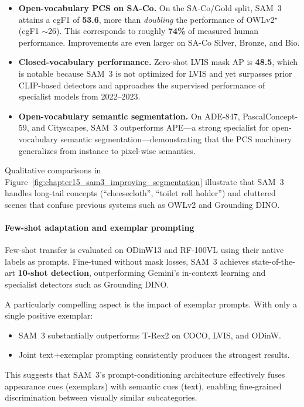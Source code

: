 \begin{enrichment}
\begin{enrichment}
		\begin{itemize}
			\item \textbf{Open-vocabulary PCS on SA-Co.} On the SA-Co/Gold split, SAM~3 attains a cgF1 of \textbf{53.6}, more than \emph{doubling} the performance of OWLv2$^\star$ (cgF1 $\sim$26). This corresponds to roughly \textbf{74\%} of measured human performance. Improvements are even larger on SA-Co Silver, Bronze, and Bio.
			\item \textbf{Closed-vocabulary performance.} Zero-shot LVIS mask AP is \textbf{48.5}, which is notable because SAM~3 is not optimized for LVIS and yet surpasses prior CLIP-based detectors and approaches the supervised performance of specialist models from 2022--2023.
			\item \textbf{Open-vocabulary semantic segmentation.} On ADE-847, PascalConcept-59, and Cityscapes, SAM~3 outperforms APE---a strong specialist for open-vocabulary semantic segmentation---demonstrating that the PCS machinery generalizes from instance to pixel-wise semantics.
		\end{itemize}
		
		Qualitative comparisons in Figure~\ref{fig:chapter15_sam3_improving_segmentation} illustrate that SAM~3 handles long-tail concepts (``cheesecloth'', ``toilet roll holder'') and cluttered scenes that confuse previous systems such as OWLv2 and Grounding DINO.
		
		\paragraph{Few-shot adaptation and exemplar prompting}
		
		Few-shot transfer is evaluated on ODinW13 and RF-100VL using their native labels as prompts. Fine-tuned without mask losses, SAM~3 achieves state-of-the-art \textbf{10-shot detection}, outperforming Gemini's in-context learning and specialist detectors such as Grounding DINO.
		
		A particularly compelling aspect is the impact of exemplar prompts. With only a single positive exemplar:
		\begin{itemize}
			\item SAM~3 substantially outperforms T-Rex2 on COCO, LVIS, and ODinW.
			\item Joint text+exemplar prompting consistently produces the strongest results.
		\end{itemize}
		This suggests that SAM~3's prompt-conditioning architecture effectively fuses appearance cues (exemplars) with semantic cues (text), enabling fine-grained discrimination between visually similar subcategories.
		

\end{enrichment}
\end{enrichment}
